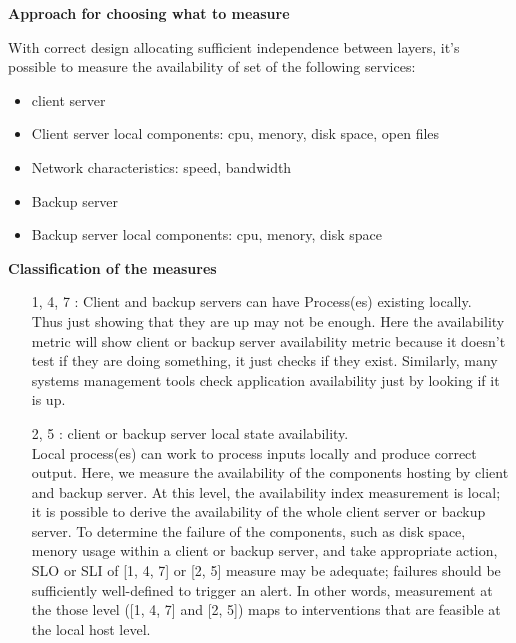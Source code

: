 \documentclass[english]{tktltiki2}
\theoremstyle{definition}
\theoremstyle{remark}
\begin{document}
\begin{flushleft}
\textbf{Approach for choosing what to measure}
\end{flushleft}
With correct design allocating sufficient independence
between layers, it's possible to measure the  availability of set of the following services:
\begin{itemize}
\item client server
\end{itemize}
\begin{itemize}
\item Client server local components: cpu, menory, disk space, open files
\end{itemize}
\begin{itemize}
\item Network characteristics: speed, bandwidth
\end{itemize}
\begin{itemize}
\item Backup server
\end{itemize}
\begin{itemize}
\item Backup server local components: cpu, menory, disk space 
\end{itemize}

\begin{flushleft}
\textbf{Classification of the measures }
\end{flushleft}
\begin{itemize}
\item[1, 4, 7]: Client and backup servers can have Process(es) existing locally.\\ Thus just showing that they are up may not be enough.
Here the availability metric will show
client or backup server availability
metric because it doesn't test if they are
doing something, it just checks if they exist.
Similarly, many systems management tools check application availability just by looking if it is up.
\end{itemize}

\begin{itemize}
\item[2, 5]: client or backup server  local state availability.\\
Local process(es) can work to process inputs locally and produce correct output. Here, we measure the availability of the components 
hosting by client and backup server. At this level, the availability index measurement is local; it is possible to derive the availability of the whole client server or backup server.
To determine the failure of the components, such as disk space, menory usage within a client or backup server, and take appropriate action, SLO or SLI of [1, 4, 7] or [2, 5] measure may be adequate;  failures should be sufficiently well-defined to trigger an alert. In other words, measurement at the those level ([1, 4, 7] and [2, 5]) maps to interventions that are feasible at the local host level. 
\end{itemize}
\end{document}
